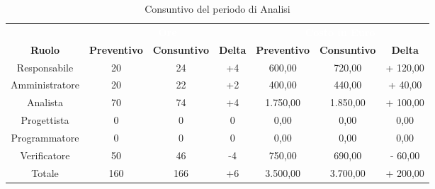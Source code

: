\begin{table}[H]
\centering
\begin{tabular}{c|ccc|ccc}
\rowcolor{greySWEight}
\multicolumn{1}{c}{} & \multicolumn{3}{c}{\textcolor{white}{\textbf{Ore}}} & \multicolumn{3}{c}{\textcolor{white}{\textbf{Costo in Euro}}} \\
{\textbf{Ruolo}} & {\textbf{Preventivo}} & {\textbf{Consuntivo}} & {\textbf{Delta}} & {\textbf{Preventivo}} & {\textbf{Consuntivo}} & {\textbf{Delta}} \\
Responsabile & 20 & 24 & +4 &  600,00 &  720,00 & + 120,00 \\
Amministratore & 20 & 22 & +2 &  400,00 &  440,00 & + 40,00 \\
Analista & 70 & 74 & +4 &  1.750,00 &  1.850,00 & + 100,00 \\
Progettista & 0 & 0 & 0 &  0,00 &  0,00 &  0,00 \\
Programmatore & 0 & 0 & 0 &  0,00 &  0,00 &  0,00 \\
Verificatore & 50 & 46 & -4 &  750,00 &  690,00 & - 60,00 \\
Totale & 160 & 166 & +6 &  3.500,00 &  3.700,00 & + 200,00 \\


\end{tabular}
\caption{Consuntivo del periodo di Analisi}
\end{table}
